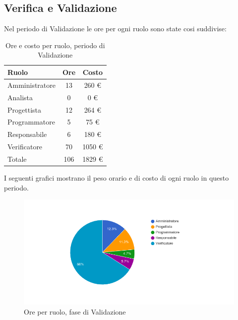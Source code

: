 \subsection{Verifica e Validazione}
Nel periodo di Validazione le ore per ogni ruolo sono state cosi suddivise:

\begin{table}[H]
	\centering
	\begin{tabular}{ l c c }
		\textbf{Ruolo} & \textbf{Ore} & \textbf{Costo} \\
		\hline
		Amministratore & 13 & 260 \euro{} \\
		Analista & 0 & 0 \euro{} \\
		Progettista & 12 & 264 \euro{} \\
		Programmatore & 5 & 75 \euro{} \\
		Responsabile & 6 & 180 \euro{} \\
		Verificatore & 70 & 1050 \euro{} \\
		\hline
		Totale & 106 & 1829 \euro{} \\
		\hline
	\end{tabular}
	\caption{Ore e costo per ruolo, periodo di Validazione}
\end{table}

I seguenti grafici mostrano il peso orario e di costo di ogni ruolo in questo periodo.

\begin{figure}[H]
  \begin{center}
    \includegraphics[width=15cm]{res/img/prospettoEconomico/orePerRuoloValidazione.png}
  \caption{Ore per ruolo, fase di Validazione}
  \end{center} 
\end{figure}  

